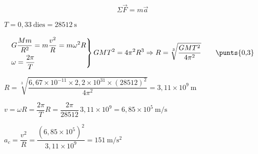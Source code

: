 \begin{solapartat}
\[ \Sigma\vec{F} = m\vec{a} \]

 $T = 0,33\ \text{dies} = 28512\ \mathrm{s}$

\[ \left.\begin{aligned} &G\frac{Mm}{R^2} = m\frac{v^2}{R} = m\omega^2 R\\ &\omega = \frac{2\pi}{T}\end{aligned}\right\}
GMT^2 = 4\pi^2R^3 \Rightarrow R = \sqrt[3]{\frac{GMT^2}{4\pi^2}} \qquad \text{\punts{0,3}} \]

 $R = \sqrt[3]{\dfrac{6,67\times 10^{-11}\times 2,2\times 10^{31}\times (28512)^2}{4\pi^2}} = 3,11\times 10^{9}\ \mathrm{m}$
\end{solapartat}

\begin{solapartat}
 $v = \omega R = \dfrac{2\pi}{T}R = \dfrac{2\pi}{28512}\,3,11\times 10^{9} = 6,85\times 10^{5}\ \mathrm{m/s}$

 $a_c = \dfrac{v^2}{R} = \dfrac{(6,85\times 10^{5})^2}{3,11\times 10^{9}} = 151\ \mathrm{m/s^2}$

\end{solapartat}
